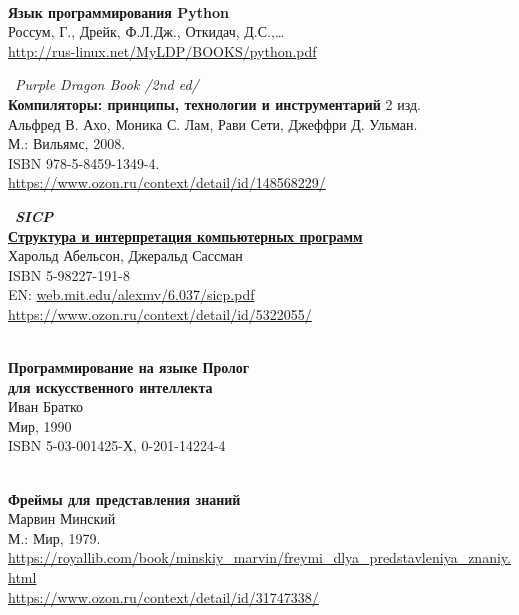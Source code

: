 \begin{thebibliography}{99}

\clearpage
{}\ \\
\textbf{Язык программирования Python}\\
Россум, Г., Дрейк, Ф.Л.Дж., Откидач, Д.С.,\ldots\\
\url{http://rus-linux.net/MyLDP/BOOKS/python.pdf}

\clearpage
{} \ \emph{Purple Dragon Book /2nd ed/}\\
\textbf{Компиляторы: принципы, технологии и инструментарий} 2 изд.\\
Альфред В. Ахо, Моника С. Лам, Рави Сети, Джеффри Д. Ульман.\\
М.: Вильямс, 2008.\\ ISBN 978-5-8459-1349-4.\\
\url{https://www.ozon.ru/context/detail/id/148568229/}

\clearpage
{} \ \textbf{\emph{SICP}\\
\href{https://drive.google.com/file/d/0B0u4WeMjO894X3lnWmhjUktKRk0/view?usp=sharing}{Структура
и интерпретация компьютерных программ}}\\
Харольд Абельсон, Джеральд Сассман\\
ISBN 5-98227-191-8\\
EN: \url{web.mit.edu/alexmv/6.037/sicp.pdf}\\
\url{https://www.ozon.ru/context/detail/id/5322055/}

\clearpage
{}\ \\
\textbf{Программирование на языке Пролог\\для искусственного интеллекта}\\
Иван Братко\\
Мир, 1990\\ ISBN 5-03-001425-Х, 0-201-14224-4

\clearpage
{}\ \\
\textbf{Фреймы для представления знаний}\\
Марвин Минский\\
 М.: Мир, 1979.\\
\url{https://royallib.com/book/minskiy_marvin/freymi_dlya_predstavleniya_znaniy.html}\\
\url{https://www.ozon.ru/context/detail/id/31747338/}

\end{thebibliography}

